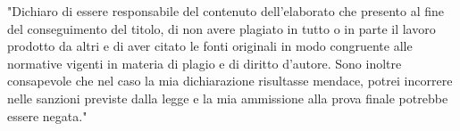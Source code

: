 \thispagestyle{empty}


\vspace*{30mm}

"Dichiaro di essere responsabile del contenuto dell'elaborato che
presento al fine del conseguimento del titolo, di non avere plagiato in
tutto o in parte il lavoro prodotto da altri e di aver citato le fonti
originali in modo congruente alle normative vigenti in materia di plagio
e di diritto d'autore. Sono inoltre consapevole che nel caso la mia
dichiarazione risultasse mendace, potrei incorrere nelle sanzioni
previste dalla legge e la mia ammissione alla prova finale potrebbe
essere negata."
